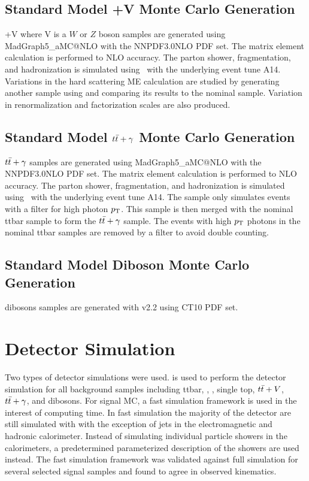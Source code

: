 \subsection{Standard Model \ttbar+V Monte Carlo Generation}

\indent \ttbar+V where V is a $W$ or $Z$ boson samples are generated using {\sc MadGraph5\_aMC\/@NLO} with the NNPDF3.0NLO PDF set. The matrix element calculation is performed to NLO accuracy. The parton shower, fragmentation, and hadronization is simulated using \pythiaeight\ with the underlying event tune A14.  Variations in the hard scattering ME calculation are studied by generating another sample using \sherpa and comparing its results to the nominal sample.  Variation in renormalization and factorization scales are also produced. \\

\subsection{Standard Model $t\bar{t}+\gamma$ Monte Carlo Generation}

\indent $t\bar{t}+\gamma$ samples are generated using {\sc MadGraph5\_aMC\/@NLO} with the NNPDF3.0NLO PDF set. The matrix element calculation is performed to NLO accuracy. The parton shower, fragmentation, and hadronization is simulated using \pythiaeight\ with the underlying event tune A14.  The sample only simulates events with a filter for high photon $p_{\mathrm{T}}$.  This sample is then merged with the nominal ttbar sample to form the $t\bar{t}+\gamma$ sample.  The events with high $p_{\mathrm{T}}$ photons in the nominal ttbar samples are removed by a filter to avoid double counting. \\

\subsection{Standard Model Diboson Monte Carlo Generation}

\indent dibosons samples are generated with \sherpa v2.2 using CT10 PDF set. 

\section{Detector Simulation}
\label{sec:MC:DET}

\indent Two types of detector simulations were used.   is used to perform the detector simulation for all background samples including ttbar, \Wjets, \Zjets, single top, $t\bar{t}+V$, $t\bar{t}+\gamma$, and dibosons.  For signal MC, a fast simulation framework is used in the interest of computing time.  In fast simulation the majority of the detector are still simulated with  with the exception of jets in the electromagnetic and hadronic calorimeter.  Instead of simulating individual particle showers in the calorimeters, a predetermined parameterized description of the showers are used instead.  The fast simulation framework was validated against full  simulation for several selected signal samples and found to agree in observed kinematics.  \\

